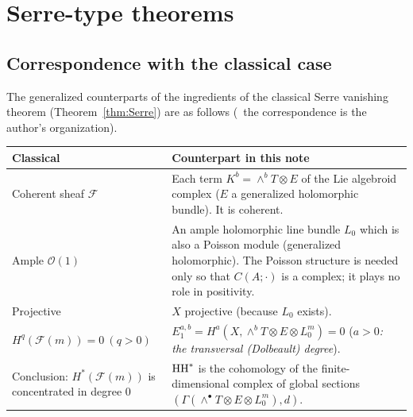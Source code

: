 \section{Serre-type theorems}\label{sec:serre}
\subsection{Correspondence with the classical case}
The generalized counterparts of the ingredients of the classical Serre vanishing theorem (Theorem~\ref{thm:Serre}) are as follows (\tK\ the correspondence is the author's organization).
\begin{center}\small
\begin{tabular}{p{4.6cm}p{9.8cm}}\toprule
Classical & Counterpart in this note\\\midrule
Coherent sheaf $\mathcal F$ & Each term $K^b=\wedge^bT\otimes E$ of the Lie algebroid complex ($E$ a generalized holomorphic bundle). It is coherent.\\
Ample $\mathcal O(1)$ & An ample holomorphic line bundle $L_0$ which is also a Poisson module (generalized holomorphic). The Poisson structure is needed only so that $C(A;\cdot)$ is a complex; it plays no role in positivity.\\
Projective & $X$ projective (because $L_0$ exists).\\
$H^q(\mathcal F(m))=0\ (q>0)$ & $E_1^{a,b}=H^a(X,\wedge^bT\otimes E\otimes L_0^m)=0$ (\emph{$a>0$: the transversal (Dolbeault) degree}).\\
Conclusion: $H^*(\mathcal F(m))$ is concentrated in degree 0 & $\mathrm{HH}^*$ is the cohomology of the finite-dimensional complex of global sections $(\Gamma(\wedge^\bullet T\otimes E\otimes L_0^m),d)$.\\\bottomrule
\end{tabular}
\end{center}

